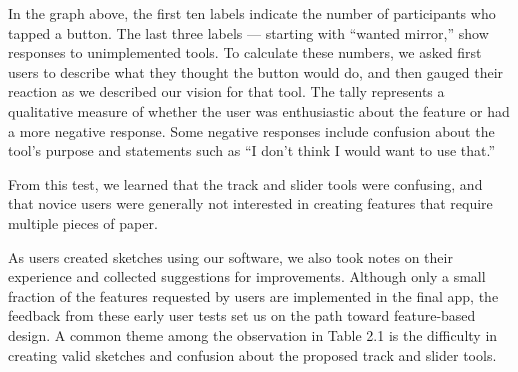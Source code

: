 In the graph above, the first ten labels indicate the number of
participants who tapped a button. The last three labels --- starting
with ``wanted mirror,'' show responses to unimplemented tools. To
calculate these numbers, we asked first users to describe what they
thought the button would do, and then gauged their reaction as we
described our vision for that tool. The tally represents a qualitative
measure of whether the user was enthusiastic about the feature or had a
more negative response. Some negative responses include confusion about
the tool's purpose and statements such as ``I don't think I would want
to use that.''

From this test, we learned that the track and slider tools were
confusing, and that novice users were generally not interested in
creating features that require multiple pieces of paper.

As users created sketches using our software, we also took notes on
their experience and collected suggestions for improvements. Although
only a small fraction of the features requested by users are implemented
in the final app, the feedback from these early user tests set us on the
path toward feature-based design. A common theme among the observation
in Table 2.1 is the difficulty in creating valid sketches and confusion
about the proposed track and slider tools.

